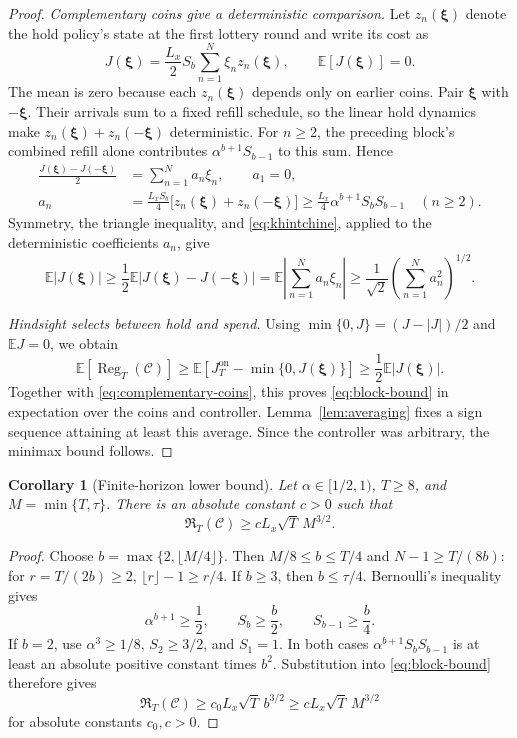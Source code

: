 \documentclass[11pt]{article}
\newtheorem{corollary}[theorem]{Corollary}
\newcommand{\E}{\mathbb E}
\newcommand{\Reg}{\operatorname{Reg}}
\begin{document}
\begin{proof}
\emph{Complementary coins give a deterministic comparison.}
Let $z_n(\boldsymbol\xi)$ denote the hold policy's state at the first
lottery round and write its cost as
\[
J(\boldsymbol\xi)=\frac{L_x}{2}S_b
\sum_{n=1}^N\xi_nz_n(\boldsymbol\xi),
\qquad \E[J(\boldsymbol\xi)]=0.
\]
The mean is zero because each $z_n(\boldsymbol\xi)$ depends only on
earlier coins. Pair $\boldsymbol\xi$ with $-\boldsymbol\xi$.
Their arrivals sum to a fixed refill schedule, so the linear hold
dynamics make $z_n(\boldsymbol\xi)+z_n(-\boldsymbol\xi)$ deterministic.
For $n\ge2$, the preceding block's combined refill alone contributes
$\alpha^{b+1}S_{b-1}$ to this sum. Hence
\begin{equation}
\label{eq:complementary-coins}
\begin{aligned}
\frac{J(\boldsymbol\xi)-J(-\boldsymbol\xi)}2
&=\sum_{n=1}^N a_n\xi_n,\qquad a_1=0,\\
a_n&=\frac{L_xS_b}{4}
\bigl[z_n(\boldsymbol\xi)+z_n(-\boldsymbol\xi)\bigr]
\ge\frac{L_x}{4}\alpha^{b+1}S_bS_{b-1}\quad(n\ge2).
\end{aligned}
\end{equation}
Symmetry, the triangle inequality, and \eqref{eq:khintchine},
applied to the deterministic coefficients $a_n$, give
\[
\E|J(\boldsymbol\xi)|
\ge\frac12\E|J(\boldsymbol\xi)-J(-\boldsymbol\xi)|
=\E\left|\sum_{n=1}^Na_n\xi_n\right|
\ge\frac1{\sqrt2}\left(\sum_{n=1}^Na_n^2\right)^{1/2}.
\]

\emph{Hindsight selects between hold and spend.}
Using $\min\{0,J\}=(J-|J|)/2$ and $\E J=0$, we obtain
\[
\E[\Reg_T(\mathcal C)]
\ge\E[J_T^{\mathrm{on}}-\min\{0,J(\boldsymbol\xi)\}]
\ge\frac12\E|J(\boldsymbol\xi)|.
\]
Together with \eqref{eq:complementary-coins}, this proves
\eqref{eq:block-bound} in expectation over the coins and controller.
Lemma~\ref{lem:averaging} fixes a sign sequence attaining at least
this average. Since the controller was arbitrary, the minimax
bound follows.
\end{proof}

\begin{corollary}[Finite-horizon lower bound]
\label{cor:finite-lower}
Let $\alpha\in[1/2,1)$, $T\ge8$, and
$M=\min\{T,\tau\}$. There is an absolute constant $c>0$ such that
\begin{equation}
\label{eq:finite-lower}
\mathfrak R_T(\mathcal C)
\ge cL_x\sqrt T\,M^{3/2}.
\end{equation}
\end{corollary}

\begin{proof}
Choose $b=\max\{2,\lfloor M/4\rfloor\}$.
Then $M/8\le b\le T/4$ and $N-1\ge T/(8b)$:
for $r=T/(2b)\ge2$, $\lfloor r\rfloor-1\ge r/4$.
If $b\ge3$, then $b\le\tau/4$. Bernoulli's inequality gives
\[
\alpha^{b+1}\ge\frac12,\qquad
S_b\ge\frac b2,\qquad S_{b-1}\ge\frac b4.
\]
If $b=2$, use $\alpha^3\ge1/8$, $S_2\ge3/2$, and $S_1=1$.
In both cases $\alpha^{b+1}S_bS_{b-1}$ is at least an absolute
positive constant times $b^2$. Substitution into
\eqref{eq:block-bound} therefore gives
\[
\mathfrak R_T(\mathcal C)
\ge c_0L_x\sqrt T\,b^{3/2}
\ge cL_x\sqrt T\,M^{3/2}
\]
for absolute constants $c_0,c>0$.
\end{proof}
\end{document}
